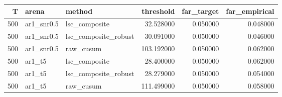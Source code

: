 \begin{tabular}{rllrrr}
\toprule
T & arena & method & threshold & far_target & far_empirical \\
\midrule
500 & ar1_snr0.5 & lsc_composite & 32.528000 & 0.050000 & 0.048000 \\
500 & ar1_snr0.5 & lsc_composite_robust & 30.091000 & 0.050000 & 0.046000 \\
500 & ar1_snr0.5 & raw_cusum & 103.192000 & 0.050000 & 0.062000 \\
500 & ar1_t5 & lsc_composite & 28.400000 & 0.050000 & 0.062000 \\
500 & ar1_t5 & lsc_composite_robust & 28.279000 & 0.050000 & 0.054000 \\
500 & ar1_t5 & raw_cusum & 111.499000 & 0.050000 & 0.058000 \\
\bottomrule
\end{tabular}
